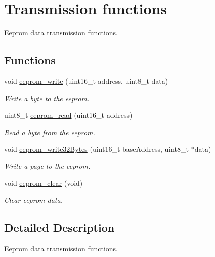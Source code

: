 \hypertarget{group___eeprom___trans}{}\section{Transmission functions}
\label{group___eeprom___trans}


Eeprom data transmission functions.  


\subsection*{Functions}
\begin{DoxyCompactItemize}
\item 
void \hyperlink{group___eeprom___trans_ga11e27abf76759a5907ef18d1351aecdb}{eeprom\+\_\+write} (uint16\+\_\+t address, uint8\+\_\+t data)
\begin{DoxyCompactList}\small\item\em Write a byte to the eeprom. \end{DoxyCompactList}\item 
uint8\+\_\+t \hyperlink{group___eeprom___trans_gafaa7cca6f6ad1d9ae49522324c825c2f}{eeprom\+\_\+read} (uint16\+\_\+t address)
\begin{DoxyCompactList}\small\item\em Read a byte from the eeprom. \end{DoxyCompactList}\item 
void \hyperlink{group___eeprom___trans_ga4f1a1c3f7642565b9dbff6bfd2e7ed0d}{eeprom\+\_\+write32\+Bytes} (uint16\+\_\+t base\+Address, uint8\+\_\+t $\ast$data)
\begin{DoxyCompactList}\small\item\em Write a page to the eeprom. \end{DoxyCompactList}\item 
void \hyperlink{group___eeprom___trans_ga7964a5a66da1c4a59a42309a93752217}{eeprom\+\_\+clear} (void)
\begin{DoxyCompactList}\small\item\em Clear eeprom data. \end{DoxyCompactList}\end{DoxyCompactItemize}


\subsection{Detailed Description}
Eeprom data transmission functions. 



